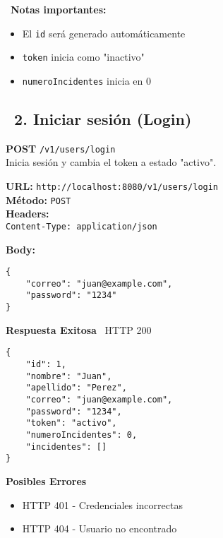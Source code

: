 \begin{tcolorbox}[notes]
    \faInfoCircle\ \textbf{Notas importantes:}
    \begin{itemize}
        \item El \texttt{id} será generado automáticamente
        \item \texttt{token} inicia como "inactivo"
        \item \texttt{numeroIncidentes} inicia en 0
    \end{itemize}
\end{tcolorbox}

\subsection*{\faServer\ 2. Iniciar sesión (Login)}

\begin{tcolorbox}[endpoint]
    \textbf{POST} \texttt{/v1/users/login}\\
    Inicia sesión y cambia el token a estado "activo".
\end{tcolorbox}

\begin{tcolorbox}[request]
    \textbf{URL:} \textcolor{urlColor}{\texttt{http://localhost:8080/v1/users/login}}\\
    \textbf{Método:} \textcolor{methodColor}{\texttt{POST}}\\
    \textbf{Headers:}\\
    \textcolor{headerColor}{\texttt{Content-Type: application/json}}
    
    \textbf{Body:}
    \begin{verbatim}
{
    "correo": "juan@example.com",
    "password": "1234"
}
    \end{verbatim}
\end{tcolorbox}

\begin{tcolorbox}[response]
    \textbf{Respuesta Exitosa} \faCheckCircle\ \textcolor{successColor}{HTTP 200}
    \begin{verbatim}
{
    "id": 1,
    "nombre": "Juan",
    "apellido": "Perez",
    "correo": "juan@example.com",
    "password": "1234",
    "token": "activo",
    "numeroIncidentes": 0,
    "incidentes": []
}
    \end{verbatim}
    
    \textbf{Posibles Errores} \faExclamationTriangle
    \begin{itemize}
        \item \textcolor{errorColor}{HTTP 401} - Credenciales incorrectas
        \item \textcolor{errorColor}{HTTP 404} - Usuario no encontrado
    \end{itemize}
\end{tcolorbox}

